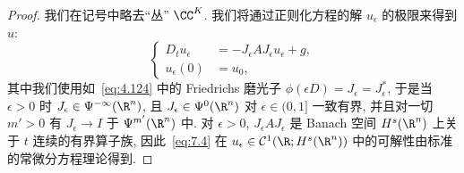 \begin{proof}
我们在记号中略去``丛'' $\CC^K$. 我们将通过正则化方程的解 $u_\epsilon$ 的极限来得到 $u$:
\begin{equation}\label{eq:7.4}
    \left\{
    \begin{aligned}
        D_t u_\epsilon &= -J_\epsilon A J_\epsilon u_\epsilon + g, \\
        u_\epsilon(0) &= u_0,
    \end{aligned}
    \right.
\end{equation}
其中我们使用如~\eqref{eq:4.124} 中的 Friedrichs 磨光子 $\phi(\epsilon D) = J_\epsilon = J_\epsilon^*$, 于是当 $\epsilon > 0$ 时 $J_\epsilon \in \Psi^{-\infty}(\R^n)$, 且 $J_\epsilon \in \Psi^0(\R^n)$ 对 $\epsilon \in (0, 1]$ 一致有界, 并且对一切 $m' > 0$ 有 $J_\epsilon \to I$ 于 $\Psi^{m'}(\R^n)$ 中. 对 $\epsilon > 0$, $J_\epsilon A J_\epsilon$ 是 Banach 空间 $H^s(\R^n)$ 上关于 $t$ 连续的有界算子族, 因此~\eqref{eq:7.4} 在 $u_\epsilon \in \mathcal{C}^1(\R; H^s(\R^n))$ 中的可解性由标准的常微分方程理论得到.


\end{proof}
